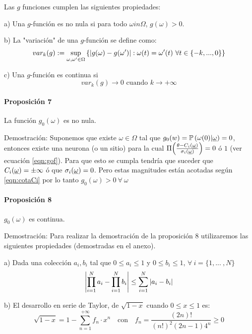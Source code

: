 Las $g$ funciones cumplen las siguientes propiedades:

a) Una $g$-función es no nula si para todo $\omega in \Omega$, $g(\omega)>0$.

b) La "variación" de una $g$-función se define como:
\begin{equation}
    var_k(g):= \sup_{\omega,\omega' \in \Omega} \left\{\left|g(\omega)-g(\omega')\right|: \omega(t)=\omega'(t) \ \forall t \in \{-k, ... ,0\}\right\}
\end{equation}

c) Una $g$-función es continua si
\begin{equation}
    var_k(g) \rightarrow 0 \text{ cuando } k \rightarrow +\infty
\end{equation}

\paragraph{Proposición 7} La función $g_0(\omega)$ es no nula.

Demostración: Suponemos que existe $\omega \in \Omega$ tal que $g_0(w)=\mathbb{P}\left(\omega(0)|\underline{\omega}\right)=0$, entonces existe una neurona (o un sitio) para la cual $\Pi\!\left(\frac{\theta-C_i(\underline{\omega})}{\sigma_i(\underline{\omega})}\right) = 0$ ó $1$ (ver ecuación \eqref{eqn:gof}).
Para que esto se cumpla tendría que suceder que $C_i(\underline{\omega}) = \pm \infty$ ó que $\sigma_i(\underline{\omega}) = 0$. Pero estas magnitudes están acotadas según \eqref{eqn:cotaCi} por lo tanto $g_0(\omega) > 0 \ \forall \ \omega$


\paragraph{Proposición 8} $g_0(\omega)$ es continua.

Demostración: Para realizar la demostración de la proposición 8 utilizaremos las siguientes propiedades (demostradas en el anexo).

a) Dada una colección $a_i,b_i$ tal que $0\leq a_i\leq 1$ y $0 \leq b_i \leq 1$, $\forall \ i = \{1, ... \ , N\}$ 
\begin{equation}
    \left|\prod_{i=1}^N a_i - \prod_{i=1}^N b_i\right| \leq \sum_{i=1}^N \left|a_i - b_i\right|
\end{equation}

b) El desarrollo en serie de Taylor, de $\sqrt{1-x}$ cuando $0 \leq x \leq 1$ es:
\begin{equation}
    \sqrt{1-x}= 1-\sum_{n=1}^{+\infty} f_n \cdot x^n \quad \text{con} \quad f_n = \frac{(2n)!}{(n!)^2 (2n-1) 4^n} \geq 0
    \label{eqn:taylor}
\end{equation}

